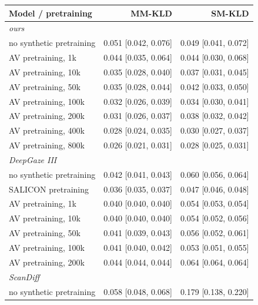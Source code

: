 \begin{table}[t]
  \centering
  \small
  \begin{tabular}{lrr}
    \toprule
    Model / pretraining & MM-KLD & SM-KLD \\
    \midrule
    \multicolumn{3}{l}{\emph{ours}} \\
    no synthetic pretraining & 0.051 \scriptsize[0.042, 0.076] & 0.049 \scriptsize[0.041, 0.072] \\
    AV pretraining, 1k & 0.044 \scriptsize[0.035, 0.064] & 0.044 \scriptsize[0.030, 0.068] \\
    AV pretraining, 10k & 0.035 \scriptsize[0.028, 0.040] & 0.037 \scriptsize[0.031, 0.045] \\
    AV pretraining, 50k & 0.035 \scriptsize[0.028, 0.044] & 0.042 \scriptsize[0.033, 0.050] \\
    AV pretraining, 100k & 0.032 \scriptsize[0.026, 0.039] & 0.034 \scriptsize[0.030, 0.041] \\
    AV pretraining, 200k & 0.031 \scriptsize[0.026, 0.037] & 0.038 \scriptsize[0.032, 0.042] \\
    AV pretraining, 400k & 0.028 \scriptsize[0.024, 0.035] & 0.030 \scriptsize[0.027, 0.037] \\
    AV pretraining, 800k & 0.026 \scriptsize[0.021, 0.031] & 0.028 \scriptsize[0.025, 0.031] \\
    \midrule
    \multicolumn{3}{l}{\emph{DeepGaze III}} \\
    no synthetic pretraining & 0.042 \scriptsize[0.041, 0.043] & 0.060 \scriptsize[0.056, 0.064] \\
    SALICON pretraining & 0.036 \scriptsize[0.035, 0.037] & 0.047 \scriptsize[0.046, 0.048] \\
    AV pretraining, 1k & 0.040 \scriptsize[0.040, 0.040] & 0.054 \scriptsize[0.053, 0.054] \\
    AV pretraining, 10k & 0.040 \scriptsize[0.040, 0.040] & 0.054 \scriptsize[0.052, 0.056] \\
    AV pretraining, 50k & 0.041 \scriptsize[0.039, 0.043] & 0.056 \scriptsize[0.052, 0.061] \\
    AV pretraining, 100k & 0.041 \scriptsize[0.040, 0.042] & 0.053 \scriptsize[0.051, 0.055] \\
    AV pretraining, 200k & 0.044 \scriptsize[0.044, 0.044] & 0.064 \scriptsize[0.064, 0.064] \\
    \midrule
    \multicolumn{3}{l}{\emph{ScanDiff}} \\
    no synthetic pretraining & 0.058 \scriptsize[0.048, 0.068] & 0.179 \scriptsize[0.138, 0.220] \\

\end{tabular}
\end{table}
